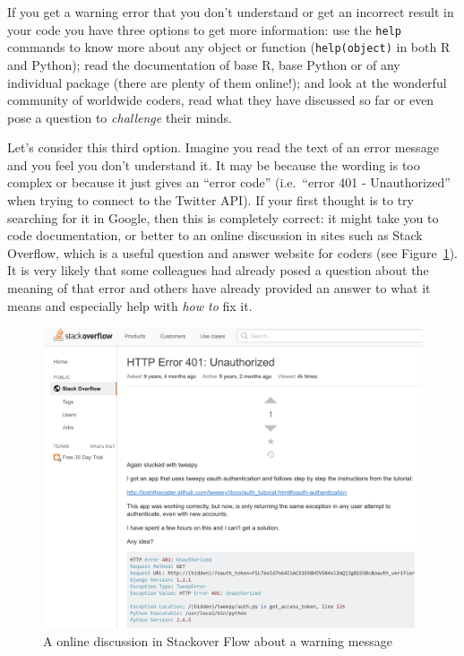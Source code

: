 
If you get a warning error that you don't understand or get an incorrect result in your code you have three options to get more information: use the \texttt{help} commands to know more about any object or function (\verb|help(object)| in both R and  Python); read the documentation of base R, base Python or of any individual package (there are plenty of them online!); and look at the wonderful community of worldwide coders, read what they have discussed so far or even pose a question to \textit{challenge} their minds.

Let's consider this third option. Imagine you read the text of an error message and you feel you don't understand it. It may be because the wording is too complex or because it just gives an ``error code'' (i.e.\ ``error 401 - Unauthorized'' when trying to connect to the Twitter API). If your first thought is to try searching for it in Google, then this is completely correct: it might take you to code documentation, or better to an online discussion in sites such as Stack Overflow, which is a useful question and answer website for coders (see Figure~\ref{fig:stackover}). It is very likely that some colleagues had already posed a question about the meaning of that error and others have already provided an answer to what it means and especially help with \textit{how to} fix it. 

\begin{figure}
\centering
\includegraphics[width=0.9\linewidth]{figures/ch4_stackover}
\caption{A online discussion in Stackover Flow about a warning message }
\label{fig:stackover}
\end{figure}

